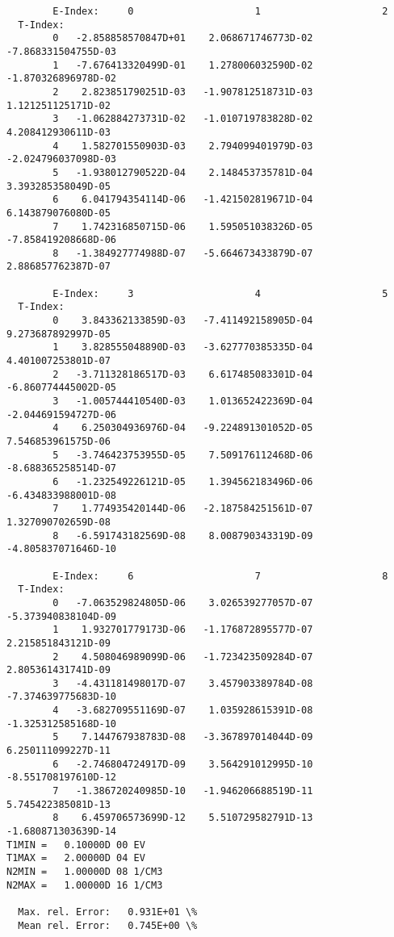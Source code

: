 \documentclass[12pt,dvipdfmx]{article}
\begin{document}
{\begin{small}
\begin{verbatim}
        E-Index:     0                     1                     2
  T-Index:
        0   -2.858858570847D+01    2.068671746773D-02   -7.868331504755D-03
        1   -7.676413320499D-01    1.278006032590D-02   -1.870326896978D-02
        2    2.823851790251D-03   -1.907812518731D-03    1.121251125171D-02
        3   -1.062884273731D-02   -1.010719783828D-02    4.208412930611D-03
        4    1.582701550903D-03    2.794099401979D-03   -2.024796037098D-03
        5   -1.938012790522D-04    2.148453735781D-04    3.393285358049D-05
        6    6.041794354114D-06   -1.421502819671D-04    6.143879076080D-05
        7    1.742316850715D-06    1.595051038326D-05   -7.858419208668D-06
        8   -1.384927774988D-07   -5.664673433879D-07    2.886857762387D-07

        E-Index:     3                     4                     5
  T-Index:
        0    3.843362133859D-03   -7.411492158905D-04    9.273687892997D-05
        1    3.828555048890D-03   -3.627770385335D-04    4.401007253801D-07
        2   -3.711328186517D-03    6.617485083301D-04   -6.860774445002D-05
        3   -1.005744410540D-03    1.013652422369D-04   -2.044691594727D-06
        4    6.250304936976D-04   -9.224891301052D-05    7.546853961575D-06
        5   -3.746423753955D-05    7.509176112468D-06   -8.688365258514D-07
        6   -1.232549226121D-05    1.394562183496D-06   -6.434833988001D-08
        7    1.774935420144D-06   -2.187584251561D-07    1.327090702659D-08
        8   -6.591743182569D-08    8.008790343319D-09   -4.805837071646D-10

        E-Index:     6                     7                     8
  T-Index:
        0   -7.063529824805D-06    3.026539277057D-07   -5.373940838104D-09
        1    1.932701779173D-06   -1.176872895577D-07    2.215851843121D-09
        2    4.508046989099D-06   -1.723423509284D-07    2.805361431741D-09
        3   -4.431181498017D-07    3.457903389784D-08   -7.374639775683D-10
        4   -3.682709551169D-07    1.035928615391D-08   -1.325312585168D-10
        5    7.144767938783D-08   -3.367897014044D-09    6.250111099227D-11
        6   -2.746804724917D-09    3.564291012995D-10   -8.551708197610D-12
        7   -1.386720240985D-10   -1.946206688519D-11    5.745422385081D-13
        8    6.459706573699D-12    5.510729582791D-13   -1.680871303639D-14
T1MIN =   0.10000D 00 EV
T1MAX =   2.00000D 04 EV
N2MIN =   1.00000D 08 1/CM3
N2MAX =   1.00000D 16 1/CM3

  Max. rel. Error:   0.931E+01 \%
  Mean rel. Error:   0.745E+00 \%



\end{verbatim}
\end{small}}
\end{document}
